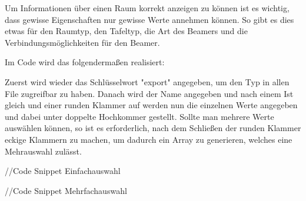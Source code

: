 
Um Informationen über einen Raum korrekt anzeigen zu können ist es wichtig, dass gewisse Eigenschaften nur gewisse Werte annehmen können. So gibt es dies etwas für den Raumtyp, den Tafeltyp, die Art des Beamers und die Verbindungsmöglichkeiten für den Beamer.

Im Code wird das folgendermaßen realisiert:

Zuerst wird wieder das Schlüsselwort "export" angegeben, um den Typ in allen File zugreifbar zu haben. Danach wird der Name angegeben und nach einem Ist gleich und einer runden Klammer auf werden nun die einzelnen Werte angegeben und dabei unter doppelte Hochkommer gestellt. Sollte man mehrere Werte auswählen können, so ist es erforderlich, nach dem Schließen der runden Klammer eckige Klammern zu machen, um dadurch ein Array zu generieren, welches eine Mehrauswahl zulässt.

//Code Snippet Einfachauswahl

//Code Snippet Mehrfachauswahl
